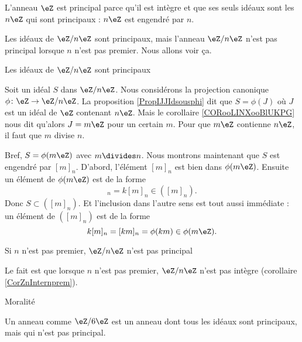 \begin{example}
    L'anneau \( \eZ\) est principal parce qu'il est intègre et que ses seuls idéaux sont les \( n\eZ\) qui sont principaux : \( n\eZ\) est engendré par \( n\).
\end{example}

\begin{example}       \label{EXooCJRPooYkWdyr}

    Les idéaux de \( \eZ/n\eZ\) sont principaux, mais l'anneau \( \eZ/n\eZ\) n'est pas principal lorsque \( n\) n'est pas premier. Nous allons voir ça.

    \begin{subproof}
        \item[Les idéaux de \( \eZ/n\eZ\) sont principaux]

            Soit un idéal \( S\) dans \( \eZ/n\eZ\). Nous considérons la projection canonique \( \phi\colon \eZ\to \eZ/n\eZ\). La proposition \ref{PropIJJIdsousphi} dit que  \( S=\phi(J)\) où \( J\) est un idéal de \( \eZ\) contenant \( n\eZ\). Mais le corollaire \ref{CORooLINXooBlUKPG} nous dit qu'alors \( J=m\eZ\) pour un certain \( m\). Pour que \( m\eZ\) contienne \( n\eZ\), il faut que \( m\) divise \( n\).

            Bref, \( S=\phi(m\eZ)\) avec \( m\divides n\). Nous montrons maintenant que \( S\) est engendré par \( [m]_n\). D'abord, l'élément \( [m]_n\) est bien dans \( \phi(m\eZ)\). Ensuite un élément de \( \phi(m\eZ)\) est de la forme 
            \begin{equation}
                [km]_n=k[m]_n\in ([m]_n).
            \end{equation}
            Donc \( S\subset ([m]_n)\). Et l'inclusion dans l'autre sens est tout aussi immédiate : un élément de \( ([m]_n)\) est de la forme
            \begin{equation}
                k[m]_n=[km]_n=\phi(km)\in \phi(m\eZ).
            \end{equation}

        \item[Si \( n\) n'est pas premier, \( \eZ/n\eZ\) n'est pas principal]
            
            Le fait est que lorsque \( n\) n'est pas premier, \( \eZ/n\eZ\) n'est pas intègre (corollaire \ref{CorZnInternprem}).

        \item[Moralité]

            Un anneau comme \( \eZ/6\eZ\) est un anneau dont tous les idéaux sont principaux, mais qui n'est pas principal.
    
    \end{subproof}
\end{example}

